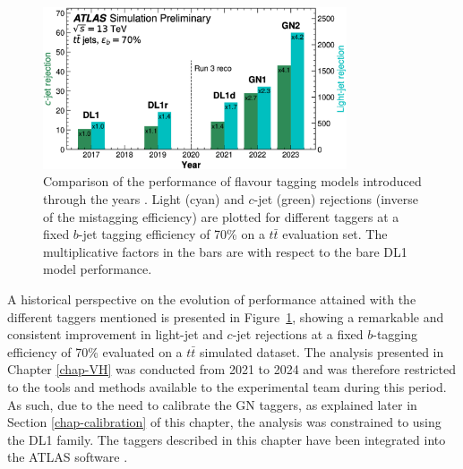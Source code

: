 \begin{figure}[h!]
  \center
  \includegraphics[width=0.8\textwidth]{Images/FTAG/storyFtag.png}
  \caption{Comparison of the performance of flavour tagging models introduced through the years \cite{ATL-PLOT-FTAG-2023-01}. Light (cyan) and $c$-jet (green) rejections (inverse of the mistagging efficiency) are plotted for different taggers at a fixed $b$-jet tagging efficiency of 70\% on a $t\bar{t}$ evaluation set. The multiplicative factors in the bars are with respect to the bare DL1 model performance.} 
  \label{fig:storyFtag}
\end{figure}

A historical perspective on the evolution of performance attained with the different taggers mentioned is presented in Figure~\ref{fig:storyFtag}, showing a remarkable and consistent improvement in light-jet and $c$-jet rejections at a fixed $b$-tagging efficiency of 70\% evaluated on a $t\bar{t}$ simulated dataset. The analysis presented in Chapter \ref{chap-VH} was conducted from 2021 to 2024 and was therefore restricted to the tools and methods available to the experimental team during this period. As such, due to the need to calibrate the GN taggers, as explained later in Section \ref{chap-calibration} of this chapter, the analysis was constrained to using the DL1 family. The taggers described in this chapter have been integrated into the ATLAS software \cite{ATL-SOFT-PUB-2021-001}. 

